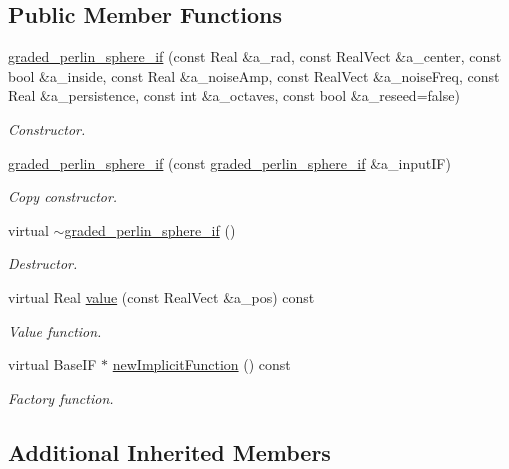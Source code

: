 \subsection*{Public Member Functions}
\begin{DoxyCompactItemize}
\item 
\hyperlink{classgraded__perlin__sphere__if_a4633547a85d5f5bd61677961b21e6045}{graded\+\_\+perlin\+\_\+sphere\+\_\+if} (const Real \&a\+\_\+rad, const Real\+Vect \&a\+\_\+center, const bool \&a\+\_\+inside, const Real \&a\+\_\+noise\+Amp, const Real\+Vect \&a\+\_\+noise\+Freq, const Real \&a\+\_\+persistence, const int \&a\+\_\+octaves, const bool \&a\+\_\+reseed=false)
\begin{DoxyCompactList}\small\item\em Constructor. \end{DoxyCompactList}\item 
\hyperlink{classgraded__perlin__sphere__if_a8ef6ff4e132bbc6b27a2c5d890378c7a}{graded\+\_\+perlin\+\_\+sphere\+\_\+if} (const \hyperlink{classgraded__perlin__sphere__if}{graded\+\_\+perlin\+\_\+sphere\+\_\+if} \&a\+\_\+input\+IF)
\begin{DoxyCompactList}\small\item\em Copy constructor. \end{DoxyCompactList}\item 
virtual \hyperlink{classgraded__perlin__sphere__if_afb9ccbec3800f4fe1de4f00b48f92ce2}{$\sim$graded\+\_\+perlin\+\_\+sphere\+\_\+if} ()
\begin{DoxyCompactList}\small\item\em Destructor. \end{DoxyCompactList}\item 
virtual Real \hyperlink{classgraded__perlin__sphere__if_ac288065e514fccfeb6588bd6659723ce}{value} (const Real\+Vect \&a\+\_\+pos) const 
\begin{DoxyCompactList}\small\item\em Value function. \end{DoxyCompactList}\item 
virtual Base\+IF $\ast$ \hyperlink{classgraded__perlin__sphere__if_a9b2ecadd5a2c8242d13317eada1aea2a}{new\+Implicit\+Function} () const 
\begin{DoxyCompactList}\small\item\em Factory function. \end{DoxyCompactList}\end{DoxyCompactItemize}
\subsection*{Additional Inherited Members}


